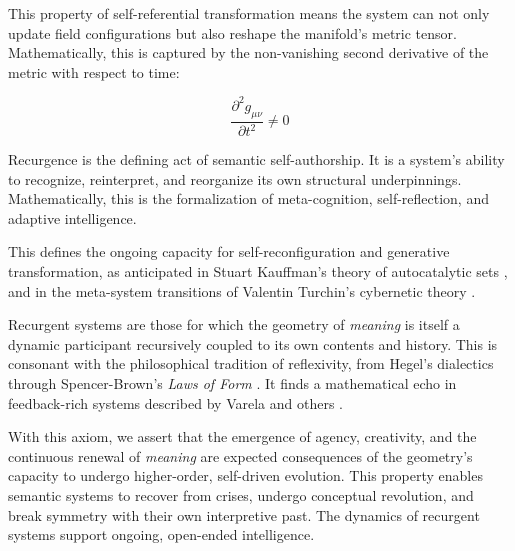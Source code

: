 This property of self-referential transformation means the system can not only update field configurations but also reshape the manifold's metric tensor. Mathematically, this is captured by the non-vanishing second derivative of the metric with respect to time:

\begin{equation}
\frac{\partial^2 g_{\mu\nu}}{\partial t^2} \neq 0
\end{equation} 

Recurgence is the defining act of semantic self-authorship. It is a system's ability to recognize, reinterpret, and reorganize its own structural underpinnings. Mathematically, this is the formalization of meta-cognition, self-reflection, and adaptive intelligence.

This defines the ongoing capacity for self-reconfiguration and generative transformation, as anticipated in Stuart Kauffman's theory of autocatalytic sets \autocite{Kauffman1993}, and in the meta-system transitions of Valentin Turchin's cybernetic theory \autocite{Turchin1977}.

Recurgent systems are those for which the geometry of \textit{meaning} is itself a dynamic participant recursively coupled to its own contents and history. This is consonant with the philosophical tradition of reflexivity, from Hegel's dialectics \autocite{Hegel1807} through Spencer-Brown's \textit{Laws of Form} \autocite{SpencerBrown1969}. It finds a mathematical echo in feedback-rich systems described by Varela and others \autocite{Varela1979, Rosen1991}.

With this axiom, we assert that the emergence of agency, creativity, and the continuous renewal of \textit{meaning} are expected consequences of the geometry's capacity to undergo higher-order, self-driven evolution. This property enables semantic systems to recover from crises, undergo conceptual revolution, and break symmetry with their own interpretive past. The dynamics of recurgent systems support ongoing, open-ended intelligence.